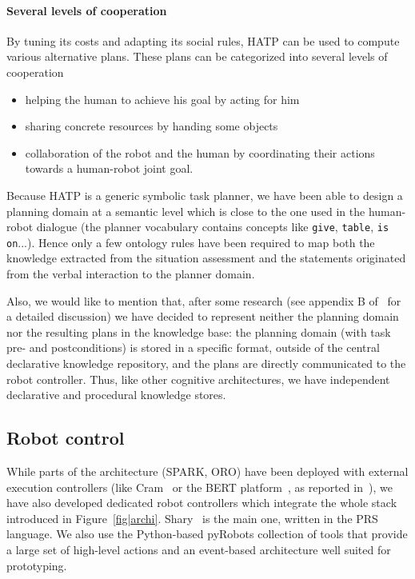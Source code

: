 \documentclass[preprint,3p,times]{elsarticle}
\begin{document}
\paragraph{Several levels of cooperation} 
By tuning its costs
and adapting its social rules, HATP can be used to compute various
alternative plans. These plans can be categorized into several levels
of cooperation

\begin{itemize}
\item helping the human to achieve his goal by acting for him
\item sharing concrete resources by handing some objects
\item collaboration of the robot and the human by coordinating their
  actions towards a human-robot joint goal.
\end{itemize}


Because HATP is a generic symbolic task planner, we have been able to design a
planning domain at a semantic level which is close to the one used in the
human-robot dialogue (the planner vocabulary contains concepts like
\texttt{give}, \texttt{table}, \texttt{is on}...). Hence only a few ontology
rules have been required to map both the knowledge extracted from the situation
assessment and the statements originated from the verbal interaction to the
planner domain.

Also, we would like to mention that, after some research (see appendix B
of~\cite{Lemaignan2012a} for a detailed discussion)  we have decided to
represent neither the planning domain nor the resulting plans in the knowledge
base: the planning domain (with task pre- and postconditions) is stored in a
specific format, outside of the central declarative knowledge repository, and
the plans are directly communicated to the robot controller. Thus, like other
cognitive architectures, we have independent declarative and procedural
knowledge stores.


\subsection{Robot control}
\label{sect|ctrl}

While parts of the architecture (SPARK, ORO) have been deployed with external
execution controllers (like {\sc Cram}~\cite{Beetz2010} or the BERT
platform~\cite{Lallee2010b}, as reported in~\cite{Lemaignan2010}), we have also
developed dedicated robot controllers which integrate the whole stack introduced
in Figure~\ref{fig|archi}. {\sc Shary}~\cite{clodic2008shary} is the main one,
written in the PRS~\cite{Ingrand1996} language. We also use the Python-based
{\sc pyRobots} collection of tools that provide a large set of high-level
actions and an event-based architecture well suited for prototyping.
\end{document}
